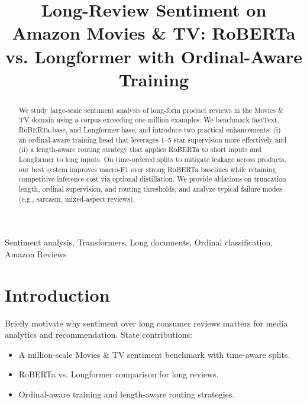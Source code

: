 \documentclass[conference]{IEEEtran}
\begin{document}
\title{Long-Review Sentiment on Amazon Movies \& TV: RoBERTa vs. Longformer with Ordinal-Aware Training}

\author{
}

\maketitle

\begin{abstract}
We study large-scale sentiment analysis of long-form product reviews in the Movies \& TV domain using a corpus exceeding one million examples. We benchmark fastText, RoBERTa-base, and Longformer-base, and introduce two practical enhancements: (i) an ordinal-aware training head that leverages 1--5 star supervision more effectively and (ii) a length-aware routing strategy that applies RoBERTa to short inputs and Longformer to long inputs. On time-ordered splits to mitigate leakage across products, our best system improves macro-F1 over strong RoBERTa baselines while retaining competitive inference cost via optional distillation. We provide ablations on truncation length, ordinal supervision, and routing thresholds, and analyze typical failure modes (e.g., sarcasm, mixed-aspect reviews).
\end{abstract}

\begin{IEEEkeywords}
Sentiment analysis, Transformers, Long documents, Ordinal classification, Amazon Reviews
\end{IEEEkeywords}

\section{Introduction}
\label{sec:intro}
Briefly motivate why sentiment over long consumer reviews matters for media analytics and recommendation. State contributions:
\begin{itemize}
\item A million-scale Movies \& TV sentiment benchmark with time-aware splits.
\item RoBERTa vs. Longformer comparison for long reviews.
\item Ordinal-aware training and length-aware routing strategies.
\end{itemize}
\end{document}
